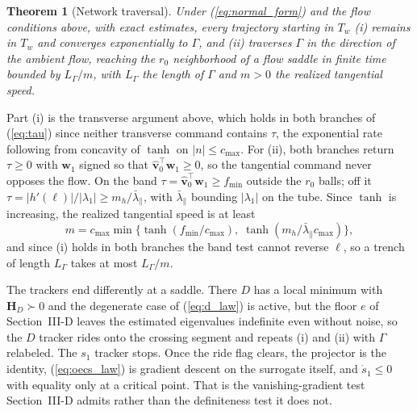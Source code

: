 \documentclass[lettersize,journal]{IEEEtran}
\newtheorem{theorem}{Theorem}
\begin{document}
\begin{theorem}[Network traversal]
\label{thm:separatrix}
Under (\ref{eq:normal_form}) and the flow conditions above, with exact
estimates, every
trajectory starting in $T_w$ (i) remains in $T_w$ and converges
exponentially to $\Gamma$, and (ii) traverses $\Gamma$ in the direction
of the ambient flow, reaching the $r_0$ neighborhood of a flow saddle in
finite time bounded by $L_\Gamma/m$, with $L_\Gamma$ the length of
$\Gamma$ and $m > 0$ the realized tangential speed.
\end{theorem}

\begin{IEEEproof}
Part (i) is the transverse argument above, which holds in both branches
of (\ref{eq:tau}) since neither transverse command contains $\tau$, the
exponential rate following from concavity of $\tanh$ on $|n| \leq
c_{\max}$. For (ii), both branches return $\tau \geq 0$ with
$\mathbf{w}_1$ signed so that $\hat{\mathbf{v}}_0^\top\mathbf{w}_1 \geq
0$, so the tangential command never opposes the flow. On the band $\tau
= \hat{\mathbf{v}}_0^\top\mathbf{w}_1 \geq f_{\min}$ outside the $r_0$
balls; off it $\tau = |h'(\ell)|/|\lambda_1| \geq
m_h/\bar{\lambda}_\parallel$, with $\bar{\lambda}_\parallel$ bounding
$|\lambda_1|$ on the tube. Since $\tanh$ is increasing, the realized
tangential speed is at least
\begin{equation}
    m = c_{\max}\min\bigl\{\tanh(f_{\min}/c_{\max}),\;
    \tanh(m_h/\bar{\lambda}_\parallel c_{\max})\bigr\},
    \label{eq:progress_rate}
\end{equation}
and since (i) holds in both branches the band test cannot reverse
$\ell$, so a trench of length $L_\Gamma$ takes at most $L_\Gamma/m$.
\end{IEEEproof}

The trackers end differently at a saddle. There $D$ has a local minimum
with $\mathbf{H}_D \succ 0$ and the degenerate case of (\ref{eq:d_law})
is active, but the floor $e$ of Section~\mbox{III-D} leaves the
estimated eigenvalues indefinite even without noise, so the $D$ tracker
rides onto the crossing segment and repeats (i) and (ii) with $\Gamma$
relabeled. The $s_1$ tracker stops. Once the ride flag clears, the
projector is the identity, (\ref{eq:oecs_law}) is gradient descent on
the surrogate itself, and $\dot{s}_1 \leq 0$ with equality only at a
critical point. That is the vanishing-gradient test
Section~\mbox{III-D} admits rather than the definiteness test it does
not.
\end{document}
